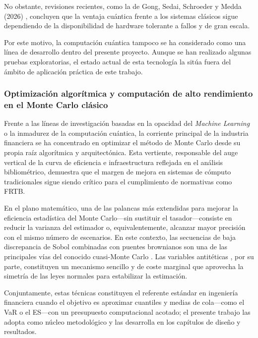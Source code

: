 \documentclass[11pt]{article}
\begin{document}
No obstante, revisiones recientes, como la de Gong, Sedai, Schroeder y Medda (2026) \cite{gong2026quantum}, concluyen que la ventaja cuántica frente a los sistemas clásicos sigue dependiendo de la disponibilidad de hardware tolerante a fallos y de gran escala.

Por este motivo, la computación cuántica tampoco se ha considerado como una línea de desarrollo dentro del presente proyecto. Aunque se han realizado algunas pruebas exploratorias, el estado actual de esta tecnología la sitúa fuera del ámbito de aplicación práctica de este trabajo.

\subsubsection{Optimización algorítmica y computación de alto rendimiento en el Monte Carlo clásico}

Frente a las líneas de investigación basadas en la opacidad del \textit{Machine Learning} o la inmadurez de la computación cuántica, la corriente principal de la industria financiera se ha concentrado en optimizar el método de Monte Carlo desde su propia raíz algorítmica y arquitectónica. Esta vertiente, responsable del auge vertical de la curva de eficiencia e infraestructura reflejada en el análisis bibliométrico, demuestra que el margen de mejora en sistemas de cómputo tradicionales sigue siendo crítico para el cumplimiento de normativas como FRTB.

En el plano matemático, una de las palancas más extendidas para mejorar la eficiencia estadística del Monte Carlo---sin sustituir el tasador---consiste en reducir la varianza del estimador o, equivalentemente, alcanzar mayor precisión con el mismo número de escenarios.
En este contexto, las secuencias de baja discrepancia de Sobol \cite{sobol1967on} combinadas con puentes brownianos son una de las principales vías del conocido cuasi-Monte Carlo \cite{boyle1997monte, glasserman2003monte}. Las variables antitéticas \cite{hammersley1956new}, por su parte, constituyen un mecanismo sencillo y de coste marginal que aprovecha la simetría de las leyes normales para estabilizar la estimación.

Conjuntamente, estas técnicas constituyen el referente estándar en ingeniería financiera cuando el objetivo es aproximar cuantiles y medias de cola---como el VaR o el ES---con un presupuesto computacional acotado; el presente trabajo las adopta como núcleo metodológico y las desarrolla en los capítulos de diseño y resultados.
\end{document}
